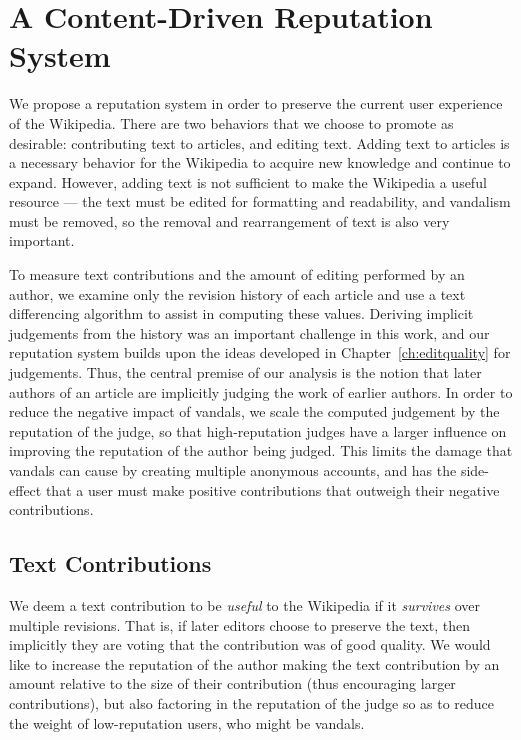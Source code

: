 \section{A Content-Driven Reputation System}

We propose a  reputation system in
order to preserve the current user experience of the Wikipedia.
There are two behaviors that we choose to promote as desirable:
contributing text to articles, and editing text.
Adding text to articles is a necessary behavior for the Wikipedia
to acquire new knowledge and continue to expand.
However, adding text is not sufficient to make the Wikipedia a
useful resource --- the text must be edited for formatting and
readability, and vandalism must be removed, so the removal and
rearrangement of text is also very important.

To measure text contributions and the amount of editing performed
by an author, we examine only the revision history of each article
and use a text differencing algorithm to assist in computing these values.
Deriving implicit judgements from the history was an important
challenge in this work, and our reputation system builds upon
the ideas developed in Chapter~\ref{ch:editquality} for judgements.
Thus, the central premise of our analysis is the notion that later
authors of an article are implicitly judging the work of earlier authors.
In order to reduce the negative impact of vandals, we scale the
computed judgement by the reputation of the judge, so that high-reputation
judges have a larger influence on improving the reputation of the
author being judged.
This limits the damage that vandals can cause by creating multiple
anonymous accounts, and has the side-effect that a user must make
positive contributions that outweigh their negative contributions.

\subsection{Text Contributions}

We deem a text contribution to be \textit{useful} to the Wikipedia
if it \textit{survives} over multiple revisions.
That is, if later editors choose to preserve the text, then
implicitly they are voting that the contribution was of good
quality.
We would like to increase the reputation of the author making
the text contribution by an amount relative to the size of their
contribution (thus encouraging larger contributions),
but also factoring in the reputation of the judge so as to reduce
the weight of low-reputation users, who might be vandals.

